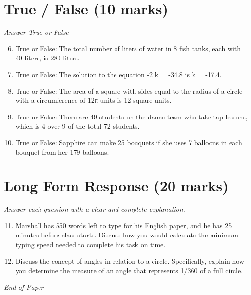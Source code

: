 \documentclass[12pt]{article}
\begin{document}
\section*{True / False (10 marks)}
\textit{Answer True or False}
\begin{enumerate}[label=\arabic*.]
\setcounter{enumi}{5}
\item True or False: The total number of liters of water in 8 fish tanks, each with 40 liters, is 280 liters.
\item True or False: The solution to the equation -2 k = -34.8 is k = -17.4.
\item True or False: The area of a square with sides equal to the radius of a circle with a circumference of 12π units is 12 square units.
\item True or False: There are 49 students on the dance team who take tap lessons, which is 4 over 9 of the total 72 students.
\item True or False: Sapphire can make 25 bouquets if she uses 7 balloons in each bouquet from her 179 balloons.
\end{enumerate}

\section*{Long Form Response (20 marks)}
\textit{Answer each question with a clear and complete explanation.}
\begin{enumerate}[label=\arabic*.]
\setcounter{enumi}{10}
\item Marshall has 550 words left to type for his English paper, and he has 25 minutes before class starts. Discuss how you would calculate the minimum typing speed needed to complete his task on time.
\item Discuss the concept of angles in relation to a circle. Specifically, explain how you determine the measure of an angle that represents 1/360 of a full circle.
\end{enumerate}

\vfill
\noindent\textit{End of Paper}
\end{document}
